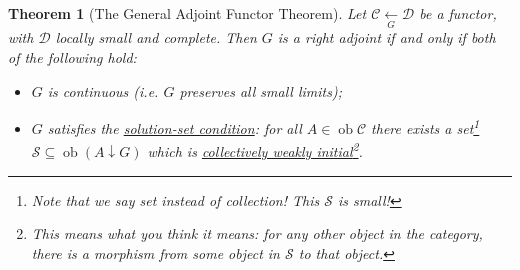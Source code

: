 \documentclass[a4paper,11pt]{article}
\theoremstyle{break_italics}
\newtheorem*{theorem*}{Theorem}
\theoremstyle{break_upright}
\theoremstyle{remark}
\newcommand{\ob}{\operatorname{ob}}
\newcommand{\C}{\mathcal{C}}
\newcommand{\D}{\mathcal{D}}
\begin{document}
\begin{theorem*}[The General Adjoint Functor Theorem]
	Let $\C \xleftarrow[G]{} \D$ be a functor, with $\D$ locally small and complete. Then $G$ is a right adjoint if and only if both of the following hold:
	\begin{itemize}
		\item $G$ is continuous (i.e. $G$ preserves all small limits);
		\item $G$ satisfies the \uline{solution-set condition}: for all $A \in \ob\C$ there exists a set\footnote{Note that we say \textit{set} instead of \textit{collection}! This $\mathcal S$ is small!} $\mathcal S \subseteq \ob(A \downarrow G)$ which is \uline{collectively weakly initial}\footnote{This means what you think it means: for any other object in the category, there is a morphism from some object in $\mathcal S$ to that object.}.
	\end{itemize}
\end{theorem*}
\end{document}

